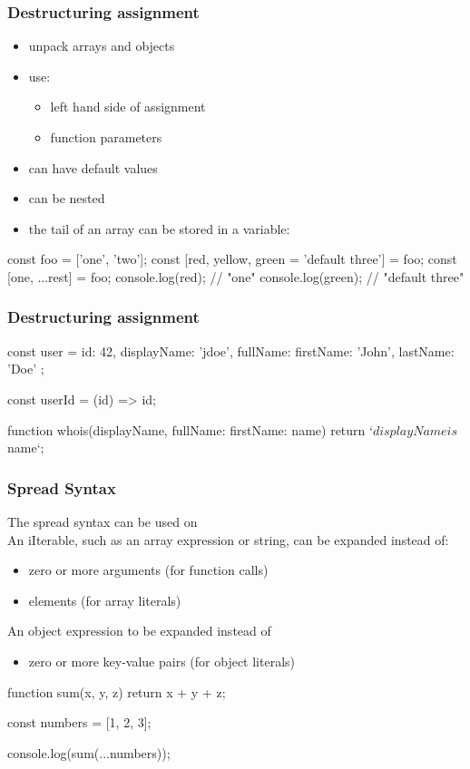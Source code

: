 \begin{frame}[fragile] \frametitle{Destructuring assignment}
\begin{itemize}
  \item unpack arrays and objects
  \item use:
  \begin{itemize}
    \item left hand side of assignment
    \item function parameters
  \end{itemize}
  \item can have default values
  \item can be nested
  \item the tail of an array can be stored in a variable: 
\end{itemize}
\begin{CodeBox}{}
const foo = ['one', 'two'];
const [red, yellow, green = 'default three'] = foo;
const [one, ...rest] = foo;
console.log(red); // "one"
console.log(green); // "default three"
\end{CodeBox}
\end{frame}

\begin{frame}[fragile] \frametitle{Destructuring assignment}
\begin{CodeBox}{}
const user = {
  id: 42,
  displayName: 'jdoe',
  fullName: {
    firstName: 'John',
    lastName: 'Doe'
  }
};

const userId = ({id}) => id;

function whois({displayName, fullName: {firstName: name}}) {
  return `${displayName} is ${name}`;
}
\end{CodeBox}
\end{frame}

\begin{frame}[fragile] \frametitle{Spread Syntax}
The spread syntax  can be used on \\
An iIterable, such as an array expression or string, can be expanded instead of:
\begin{itemize}
  \item zero or more arguments (for function calls)
  \item elements (for array literals)
\end{itemize}

An object expression to be expanded instead of
\begin{itemize}
  \item  zero or more key-value pairs (for object literals)
\end{itemize}

\begin{CodeBox}{}
function sum(x, y, z) {
  return x + y + z;
}

const numbers = [1, 2, 3];

console.log(sum(...numbers));
\end{CodeBox}
\end{frame}

